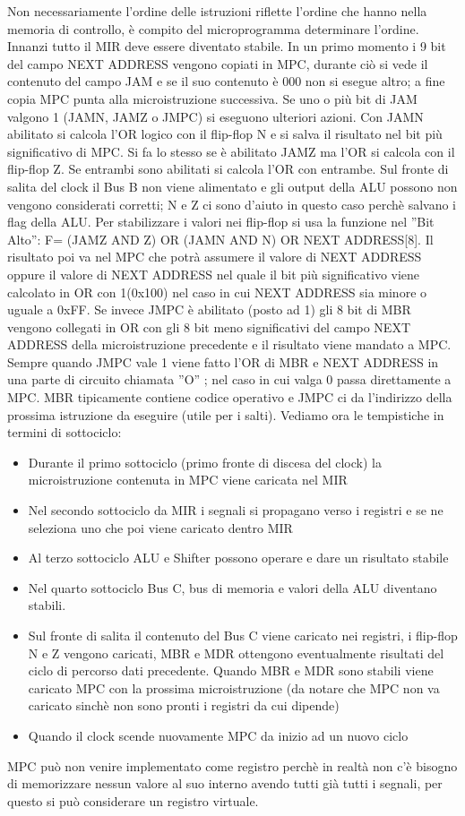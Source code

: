 Non necessariamente l'ordine delle istruzioni riflette l'ordine che hanno nella memoria di controllo, è compito del microprogramma determinare l'ordine. Innanzi tutto il MIR deve essere diventato stabile. In un primo momento i 9 bit del campo NEXT ADDRESS vengono copiati in MPC, durante ciò si vede il contenuto del campo JAM e se il suo contenuto è 000 non si esegue altro; a fine copia MPC punta alla microistruzione successiva. Se uno o più bit di JAM valgono 1 (JAMN, JAMZ o JMPC) si eseguono ulteriori azioni. Con JAMN abilitato si calcola l'OR logico con il flip-flop N e si salva il risultato nel bit più significativo di MPC. Si fa lo stesso se è abilitato JAMZ ma l'OR si calcola con il flip-flop Z. Se entrambi sono abilitati si calcola l'OR con entrambe. Sul fronte di salita del clock il Bus B non viene alimentato e gli output della ALU possono non vengono considerati corretti; N e Z ci sono d'aiuto in questo caso perchè salvano i flag della ALU. Per stabilizzare i valori nei flip-flop si usa la funzione nel ''Bit Alto'': 
F= (JAMZ AND Z) OR (JAMN AND N) OR NEXT ADDRESS[8]. Il risultato poi va nel MPC che potrà assumere il valore di NEXT ADDRESS oppure il valore di NEXT ADDRESS nel quale il bit più significativo viene calcolato in OR con 1(0x100) nel caso in cui NEXT ADDRESS sia minore o uguale a 0xFF. Se invece JMPC è abilitato (posto ad 1) gli 8 bit di MBR vengono collegati in OR con gli 8 bit meno significativi del campo NEXT ADDRESS della microistruzione precedente e il risultato viene mandato a MPC. Sempre quando JMPC vale 1 viene fatto l'OR di MBR e NEXT ADDRESS in una parte di circuito chiamata ''O'' ; nel caso in cui valga 0 passa direttamente a MPC. MBR tipicamente contiene codice operativo e JMPC ci da l'indirizzo della prossima istruzione da eseguire (utile per i salti). Vediamo ora le tempistiche in termini di sottociclo:
\begin{itemize}
\item Durante il primo sottociclo (primo fronte di discesa del clock) la microistruzione contenuta in MPC viene caricata nel MIR
\item Nel secondo sottociclo da MIR i segnali si propagano verso i registri e se ne seleziona uno che poi viene caricato dentro MIR
\item Al terzo sottociclo ALU e Shifter possono operare e dare un risultato stabile
\item Nel quarto sottociclo Bus C, bus di memoria e valori della ALU diventano stabili.
\item Sul fronte di salita il contenuto del Bus C viene caricato nei registri, i flip-flop N e Z vengono caricati, MBR e MDR ottengono eventualmente risultati del ciclo di percorso dati precedente. Quando MBR e MDR sono stabili viene caricato MPC con la prossima microistruzione (da notare che MPC non va caricato sinchè non sono pronti i registri da cui dipende)
\item Quando il clock scende nuovamente MPC da inizio ad un nuovo ciclo
\end{itemize}
MPC può non venire implementato come registro perchè in realtà non c'è bisogno di memorizzare nessun valore al suo interno avendo tutti già tutti i segnali, per questo si può considerare un registro virtuale. 













